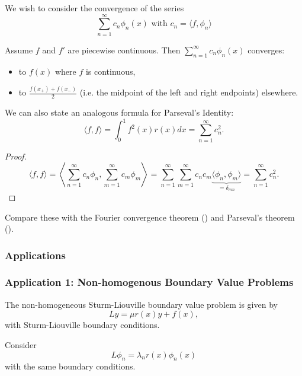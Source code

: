 We wish to consider the convergence of the series
\[
\sum_{n=1}^{\infty} c_n \phi_n(x) \text{ with } c_n = \langle f, \phi_n\rangle
\]
\begin{theorem}
	Assume $f$ and $f'$ are piecewise continuous. Then $\sum_{n=1}^{\infty} c_n \phi_n(x)$ converges:
	\begin{itemize}
		\item to $f(x)$ where $f$ is continuous,
		\item to $\frac{f(x_+)+f(x_-)}{2}$ (i.e. the midpoint of the left and right endpoints) elsewhere.
	\end{itemize}
\end{theorem}

We can also state an analogous formula for Parseval's Identity:
\begin{equation}
	\langle f,f\rangle = \int_0^1 f^2(x)r(x)dx = \sum_{n=1}^{\infty} c_n^2.
\end{equation}

\begin{proof}
	\[
	\langle f,f\rangle = \left\langle \sum_{n=1}^{\infty} c_n \phi_n, \sum_{m=1}^{\infty} c_m \phi_m\right\rangle = \sum_{n=1}^{\infty} \sum_{m=1}^{\infty} c_n c_m \underbrace{\langle \phi_n, \phi_m\rangle}_{=\delta_{mn}} = \sum_{n=1}^{\infty} c_n^2.
	\]
\end{proof}

Compare these with the Fourier convergence theorem () and Parseval's theorem ().

\subsubsection{Applications}

\subsubsection*{Application 1: Non-homogenous Boundary Value Problems}

The non-homogeneous Sturm-Liouville boundary value problem is given by
\begin{equation}\label{eq6.2.2}
	Ly = \mu r(x) y + f(x),
\end{equation}
with Sturm-Liouville boundary conditions.

Consider
\[
L \phi_n = \lambda_n r(x) \phi_n(x)
\]
with the same boundary conditions.


